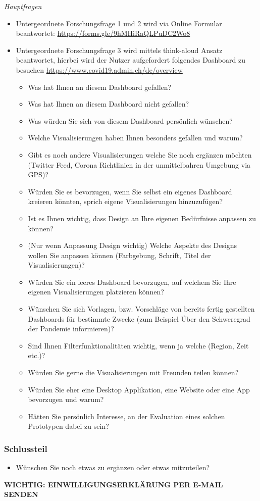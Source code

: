 \documentclass[12pt, oneside]{article}
\begin{document}
\textit{Hauptfragen}
\begin{itemize}
    \item Untergeordnete Forschungsfrage 1 und 2 wird via Online Formular beantwortet: \url{https://forms.gle/9hMHiRaQLPuDC2Wo8}
    \item Untergeordnete Forschungsfrage 3 wird mittels think-aloud Ansatz beantwortet, hierbei wird der Nutzer aufgefordert folgendes Dashboard zu besuchen \url{https://www.covid19.admin.ch/de/overview}
    \begin{itemize}
        \item Was hat Ihnen an diesem Dashboard gefallen?
        \item Was hat Ihnen an diesem Dashboard nicht gefallen?
        \item Was würden Sie sich von diesem Dashboard persönlich wünschen?
        \item Welche Visualisierungen haben Ihnen besonders gefallen und warum?
        \item Gibt es noch andere Visualisierungen welche Sie noch ergänzen möchten (Twitter Feed, Corona Richtlinien in der unmittelbahren Umgebung via GPS)?
        \item Würden Sie es bevorzugen, wenn Sie selbst ein eigenes Dashboard kreieren könnten, sprich eigene Visualisierungen hinzuzufügen?
        \item Ist es Ihnen wichtig, dass Design an Ihre eigenen Bedürfnisse anpassen zu können?
        \item (Nur wenn Anpassung Design wichtig) Welche Aspekte des Designs wollen Sie anpassen können (Farbgebung, Schrift, Titel der Visualisierungen)?
        \item Würden Sie ein leeres Dashboard bevorzugen, auf welchem Sie Ihre eigenen Visualisierungen platzieren können?
        \item Wünschen Sie sich Vorlagen, bzw. Vorschläge von bereits fertig gestellten Dashboards für bestimmte Zwecke (zum Beispiel Über den Schweregrad der Pandemie informieren)?
        \item Sind Ihnen Filterfunktionalitäten wichtig, wenn ja welche (Region, Zeit etc.)?
        \item Würden Sie gerne die Visualisierungen mit Freunden teilen können?
        \item Würden Sie eher eine Desktop Applikation, eine Website oder eine App bevorzugen und warum?
        \item Hätten Sie persönlich Interesse, an der Evaluation eines solchen Prototypen dabei zu sein?
    \end{itemize}
\end{itemize}


\subsubsection*{Schlussteil}
\begin{itemize}
    \item Wünschen Sie noch etwas zu ergänzen oder etwas mitzuteilen?
\end{itemize}

\textbf{WICHTIG: EINWILLIGUNGSERKLÄRUNG PER E-MAIL SENDEN}
\end{document}
